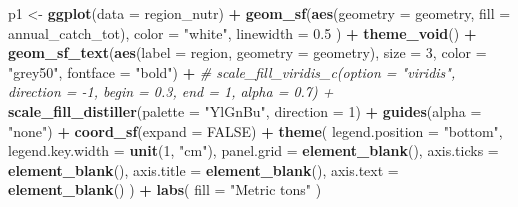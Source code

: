 \documentclass[
]{book}
\newenvironment{Shaded}{\begin{snugshade}}{\end{snugshade}}
\newcommand{\AttributeTok}[1]{\textcolor[rgb]{0.13,0.29,0.53}{#1}}
\newcommand{\CommentTok}[1]{\textcolor[rgb]{0.56,0.35,0.01}{\textit{#1}}}
\newcommand{\ConstantTok}[1]{\textcolor[rgb]{0.56,0.35,0.01}{#1}}
\newcommand{\DecValTok}[1]{\textcolor[rgb]{0.00,0.00,0.81}{#1}}
\newcommand{\FloatTok}[1]{\textcolor[rgb]{0.00,0.00,0.81}{#1}}
\newcommand{\FunctionTok}[1]{\textcolor[rgb]{0.13,0.29,0.53}{\textbf{#1}}}
\newcommand{\NormalTok}[1]{#1}
\newcommand{\OtherTok}[1]{\textcolor[rgb]{0.56,0.35,0.01}{#1}}
\newcommand{\SpecialCharTok}[1]{\textcolor[rgb]{0.81,0.36,0.00}{\textbf{#1}}}
\newcommand{\StringTok}[1]{\textcolor[rgb]{0.31,0.60,0.02}{#1}}
\begin{document}
\begin{Shaded}
\begin{Highlighting}[]
\NormalTok{p1 }\OtherTok{\textless{}{-}} 
  \FunctionTok{ggplot}\NormalTok{(}\AttributeTok{data =}\NormalTok{ region\_nutr) }\SpecialCharTok{+}
  \FunctionTok{geom\_sf}\NormalTok{(}\FunctionTok{aes}\NormalTok{(}\AttributeTok{geometry =}\NormalTok{ geometry, }\AttributeTok{fill =}\NormalTok{ annual\_catch\_tot),}
          \AttributeTok{color =} \StringTok{"white"}\NormalTok{, }\AttributeTok{linewidth =} \FloatTok{0.5}
\NormalTok{  ) }\SpecialCharTok{+}
  \FunctionTok{theme\_void}\NormalTok{() }\SpecialCharTok{+}
  \FunctionTok{geom\_sf\_text}\NormalTok{(}\FunctionTok{aes}\NormalTok{(}\AttributeTok{label =}\NormalTok{ region, }\AttributeTok{geometry =}\NormalTok{ geometry), }\AttributeTok{size =} \DecValTok{3}\NormalTok{, }\AttributeTok{color =} \StringTok{"grey50"}\NormalTok{, }\AttributeTok{fontface =} \StringTok{"bold"}\NormalTok{) }\SpecialCharTok{+}
  \CommentTok{\# scale\_fill\_viridis\_c(option = "viridis", direction = {-}1, begin = 0.3, end = 1, alpha = 0.7) +}
  \FunctionTok{scale\_fill\_distiller}\NormalTok{(}\AttributeTok{palette =} \StringTok{"YlGnBu"}\NormalTok{, }\AttributeTok{direction =} \DecValTok{1}\NormalTok{) }\SpecialCharTok{+}
  \FunctionTok{guides}\NormalTok{(}\AttributeTok{alpha =} \StringTok{"none"}\NormalTok{) }\SpecialCharTok{+}
  \FunctionTok{coord\_sf}\NormalTok{(}\AttributeTok{expand =} \ConstantTok{FALSE}\NormalTok{) }\SpecialCharTok{+}
  \FunctionTok{theme}\NormalTok{(}
    \AttributeTok{legend.position =} \StringTok{"bottom"}\NormalTok{,}
    \AttributeTok{legend.key.width =} \FunctionTok{unit}\NormalTok{(}\DecValTok{1}\NormalTok{, }\StringTok{"cm"}\NormalTok{),}
    \AttributeTok{panel.grid =} \FunctionTok{element\_blank}\NormalTok{(),}
    \AttributeTok{axis.ticks =} \FunctionTok{element\_blank}\NormalTok{(),}
    \AttributeTok{axis.title =} \FunctionTok{element\_blank}\NormalTok{(),}
    \AttributeTok{axis.text =} \FunctionTok{element\_blank}\NormalTok{()}
\NormalTok{  ) }\SpecialCharTok{+}
  \FunctionTok{labs}\NormalTok{(}
    \AttributeTok{fill =} \StringTok{"Metric tons"}
\NormalTok{  )}



\end{Highlighting}
\end{Shaded}
\end{document}
